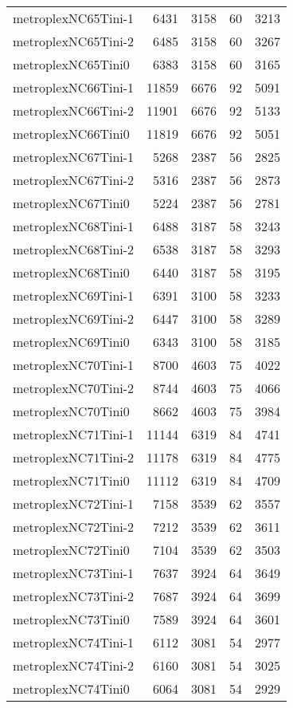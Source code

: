 \begin{longtable}{lrrrr}
metroplexNC65Tini-1 & 6431 & 3158 & 60 & 3213 \\
metroplexNC65Tini-2 & 6485 & 3158 & 60 & 3267 \\
metroplexNC65Tini0 & 6383 & 3158 & 60 & 3165 \\
metroplexNC66Tini-1 & 11859 & 6676 & 92 & 5091 \\
metroplexNC66Tini-2 & 11901 & 6676 & 92 & 5133 \\
metroplexNC66Tini0 & 11819 & 6676 & 92 & 5051 \\
metroplexNC67Tini-1 & 5268 & 2387 & 56 & 2825 \\
metroplexNC67Tini-2 & 5316 & 2387 & 56 & 2873 \\
metroplexNC67Tini0 & 5224 & 2387 & 56 & 2781 \\
metroplexNC68Tini-1 & 6488 & 3187 & 58 & 3243 \\
metroplexNC68Tini-2 & 6538 & 3187 & 58 & 3293 \\
metroplexNC68Tini0 & 6440 & 3187 & 58 & 3195 \\
metroplexNC69Tini-1 & 6391 & 3100 & 58 & 3233 \\
metroplexNC69Tini-2 & 6447 & 3100 & 58 & 3289 \\
metroplexNC69Tini0 & 6343 & 3100 & 58 & 3185 \\
metroplexNC70Tini-1 & 8700 & 4603 & 75 & 4022 \\
metroplexNC70Tini-2 & 8744 & 4603 & 75 & 4066 \\
metroplexNC70Tini0 & 8662 & 4603 & 75 & 3984 \\
metroplexNC71Tini-1 & 11144 & 6319 & 84 & 4741 \\
metroplexNC71Tini-2 & 11178 & 6319 & 84 & 4775 \\
metroplexNC71Tini0 & 11112 & 6319 & 84 & 4709 \\
metroplexNC72Tini-1 & 7158 & 3539 & 62 & 3557 \\
metroplexNC72Tini-2 & 7212 & 3539 & 62 & 3611 \\
metroplexNC72Tini0 & 7104 & 3539 & 62 & 3503 \\
metroplexNC73Tini-1 & 7637 & 3924 & 64 & 3649 \\
metroplexNC73Tini-2 & 7687 & 3924 & 64 & 3699 \\
metroplexNC73Tini0 & 7589 & 3924 & 64 & 3601 \\
metroplexNC74Tini-1 & 6112 & 3081 & 54 & 2977 \\
metroplexNC74Tini-2 & 6160 & 3081 & 54 & 3025 \\
metroplexNC74Tini0 & 6064 & 3081 & 54 & 2929 \\

\end{longtable}

